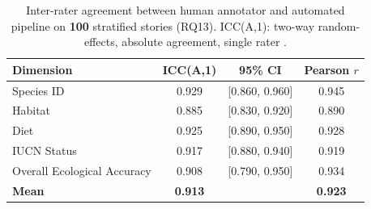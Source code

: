 \begin{table}[h]
\centering
\caption{Inter-rater agreement between human annotator and automated pipeline on \textbf{100} stratified stories (RQ13). ICC(A,1): two-way random-effects, absolute agreement, single rater \citep{Cicchetti1994}.}
\label{tab:rq13_icc}
\begin{tabular}{lccc}
\toprule
\textbf{Dimension} & \textbf{ICC(A,1)} & \textbf{95\% CI} & \textbf{Pearson $r$} \\
\midrule
Species ID & 0.929 & [0.860, 0.960] & 0.945 \\
Habitat & 0.885 & [0.830, 0.920] & 0.890 \\
Diet & 0.925 & [0.890, 0.950] & 0.928 \\
IUCN Status & 0.917 & [0.880, 0.940] & 0.919 \\
Overall Ecological Accuracy & 0.908 & [0.790, 0.950] & 0.934 \\
\midrule
\textbf{Mean} & \textbf{0.913} & & \textbf{0.923} \\
\bottomrule
\end{tabular}
\end{table}

